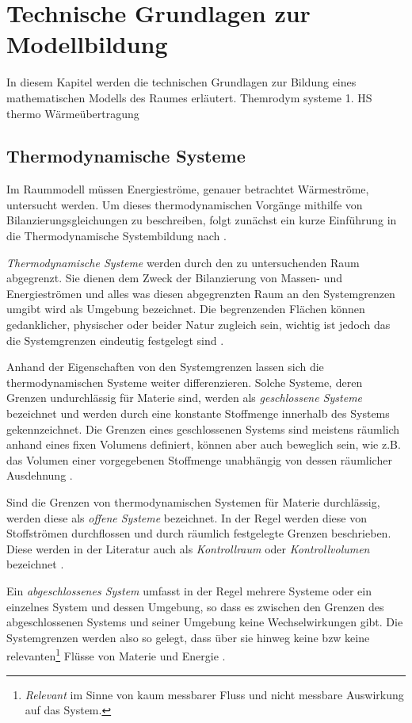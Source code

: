 \section{Technische Grundlagen zur Modellbildung}
\label{sec:grundlagenmodell}
In diesem Kapitel werden die technischen Grundlagen zur Bildung eines mathematischen Modells des Raumes erläutert.
Themrodym systeme
1. HS thermo
Wärmeübertragung

\subsection{Thermodynamische Systeme}
Im Raummodell müssen Energieströme, genauer betrachtet Wärmeströme, untersucht werden. Um dieses thermodynamischen Vorgänge mithilfe von Bilanzierungsgleichungen zu beschreiben, folgt zunächst ein kurze Einführung in die Thermodynamische Systembildung nach \cite[S.~11ff.]{ba12}.

\textit{Thermodynamische Systeme} werden durch den zu untersuchenden Raum abgegrenzt. Sie dienen dem Zweck der Bilanzierung von Massen- und Energieströmen und alles was diesen abgegrenzten Raum an den Systemgrenzen umgibt wird als Umgebung bezeichnet. Die begrenzenden Flächen können gedanklicher, physischer oder beider Natur zugleich sein, wichtig ist jedoch das die Systemgrenzen eindeutig festgelegt sind \cite[S.~11]{ba12}.

Anhand der Eigenschaften von den Systemgrenzen lassen sich die thermodynamischen Systeme weiter differenzieren.
Solche Systeme, deren Grenzen undurchlässig für Materie sind, werden als \textit{geschlossene Systeme} bezeichnet und werden durch eine konstante Stoffmenge innerhalb des Systems gekennzeichnet. Die Grenzen eines geschlossenen Systems sind meistens räumlich anhand eines fixen Volumens definiert, können aber auch beweglich sein, wie z.B. das Volumen einer vorgegebenen Stoffmenge unabhängig von dessen räumlicher Ausdehnung \cite[S.~12]{ba12}.

Sind die Grenzen von thermodynamischen Systemen für Materie durchlässig, werden diese als \textit{offene Systeme} bezeichnet. In der Regel werden diese von Stoffströmen durchflossen und durch räumlich festgelegte Grenzen beschrieben. Diese werden in der Literatur auch als \textit{Kontrollraum} oder \textit{Kontrollvolumen} bezeichnet \cite[S.~12]{ba12}.

Ein \textit{abgeschlossenes System} umfasst in der Regel mehrere Systeme oder ein einzelnes System und dessen Umgebung, so dass es zwischen den Grenzen des abgeschlossenen Systems und seiner Umgebung keine Wechselwirkungen gibt. Die Systemgrenzen werden also so gelegt, dass über sie hinweg keine \acrlong{bzw} keine relevanten\footnote{\textit{Relevant} im Sinne von kaum messbarer Fluss und nicht messbare Auswirkung auf das System.} Flüsse von Materie und Energie \cite[S.~13]{ba12}.

